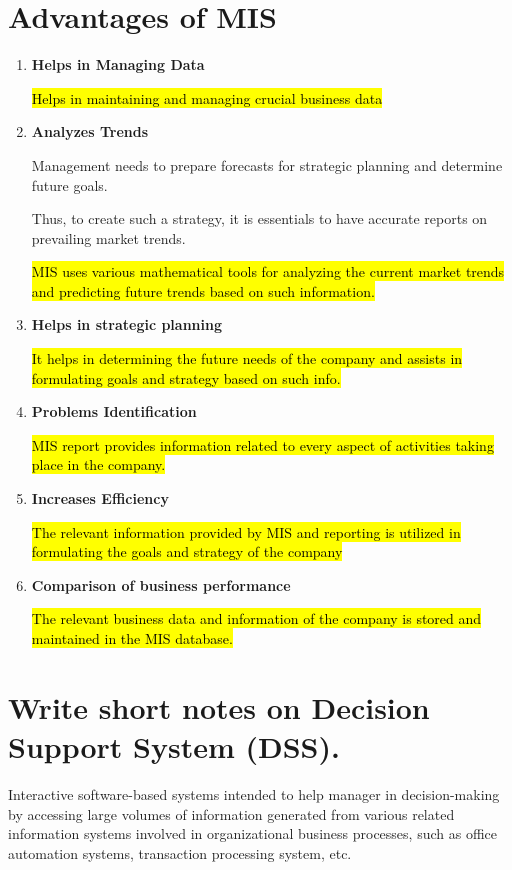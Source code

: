 \documentclass[10pt]{article}
\begin{document}
\newpage
\section{Advantages of MIS}
\begin{enumerate}
  \item \textbf{Helps in Managing Data}

    \hl{Helps in maintaining and managing crucial business data}
  
  \item \textbf{Analyzes Trends}

    Management needs to prepare forecasts for strategic planning and determine future goals.
    
    Thus, to create such a strategy, it is essentials to have accurate reports on prevailing
    market trends. 

    \hl{MIS uses various mathematical tools for analyzing the current market trends
    and predicting future trends based on such information.}

  \item \textbf{Helps in strategic planning}

    \hl{It helps 
    in determining the future needs of the company and assists in formulating goals and 
    strategy based on such info.}

  \item \textbf{Problems Identification}

    \hl{MIS report provides information related to every aspect of activities taking place in the 
    company.}

  \item \textbf{Increases Efficiency}

    \hl{The relevant information provided by MIS and reporting is utilized in formulating the goals
    and strategy of the company}

  \item \textbf{Comparison of business performance}
    
    \hl{The relevant business data and information of the company is stored and maintained in the 
    MIS database.}

\end{enumerate}


\newpage
\section{Write short notes on Decision Support System (DSS).}
Interactive software-based systems intended to help manager 
in decision-making by accessing large volumes of information generated from various related
information systems involved in organizational business processes, such as office automation
systems, transaction processing system, etc.
\end{document}
